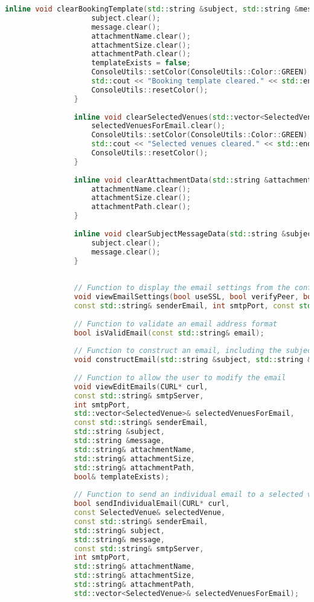 \documentclass{article}
\begin{document}
\begin{mdframed}[backgroundcolor=background, hidealllines=false, innerleftmargin=15pt, innerrightmargin=5pt, innertopmargin=0pt, innerbottommargin=-5pt, linecolor=accent]
\begin{lstlisting}[language=C++]
				inline void clearBookingTemplate(std::string &subject, std::string &message, std::string &attachmentName, std::string &attachmentSize, std::string &attachmentPath, bool& templateExists) {
					subject.clear();
					message.clear();
					attachmentName.clear();
					attachmentSize.clear();
					attachmentPath.clear();
					templateExists = false;
					ConsoleUtils::setColor(ConsoleUtils::Color::GREEN);
					std::cout << "Booking template cleared." << std::endl; 
					ConsoleUtils::resetColor();
				}
				
				inline void clearSelectedVenues(std::vector<SelectedVenue>& selectedVenuesForEmail) {
					selectedVenuesForEmail.clear();
					ConsoleUtils::setColor(ConsoleUtils::Color::GREEN);
					std::cout << "Selected venues cleared." << std::endl; 
					ConsoleUtils::resetColor();
				}
				
				inline void clearAttachmentData(std::string &attachmentName, std::string &attachmentSize, std::string &attachmentPath) {
					attachmentName.clear();
					attachmentSize.clear();
					attachmentPath.clear();
				}
				
				inline void clearSubjectMessageData(std::string &subject, std::string &message) {
					subject.clear();
					message.clear();
				}
				
				
				// Function to display the email settings from the configuration file
				void viewEmailSettings(bool useSSL, bool verifyPeer, bool verifyHost, bool verbose,  
				const std::string& senderEmail, int smtpPort, const std::string& smtpServer);
				
				// Function to validate an email address format
				bool isValidEmail(const std::string& email);
				
				// Function to construct an email, including the subject, message, and attachment details
				void constructEmail(std::string &subject, std::string &message, std::string &attachmentPath, std::string &attachmentName, std::string &attachmentSize, std::istream &in = std::cin);
				
				// Function to allow the user to modify the email
				void viewEditEmails(CURL* curl, 
				const std::string& smtpServer,
				int smtpPort,
				std::vector<SelectedVenue>& selectedVenuesForEmail,
				const std::string& senderEmail, 
				std::string &subject, 
				std::string &message, 
				std::string& attachmentName, 
				std::string& attachmentSize, 
				std::string& attachmentPath, 
				bool& templateExists);
				
				// Function to send an individual email to a selected venue
				bool sendIndividualEmail(CURL* curl,
				const SelectedVenue& selectedVenue,
				const std::string& senderEmail,
				std::string& subject,
				std::string& message,
				const std::string& smtpServer,
				int smtpPort,
				std::string& attachmentName,
				std::string& attachmentSize,
				std::string& attachmentPath,
				std::vector<SelectedVenue>& selectedVenuesForEmail);
				

\end{lstlisting}
\end{mdframed}
\end{document}
